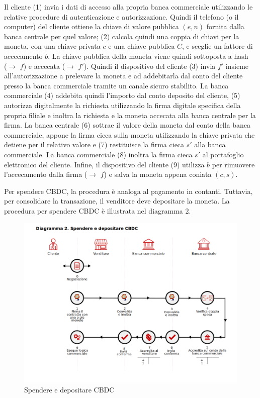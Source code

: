\documentclass[a4paper]{article}
\begin{document}
Il cliente (1) invia i dati di accesso alla propria banca commerciale
utilizzando le relative procedure di autenticazione e autorizzazione.
Quindi il telefono (o il computer) del cliente ottiene la chiave di
valore pubblica $(e, n)$ fornita dalla banca centrale per quel valore; (2)
calcola quindi una coppia di chiavi per la moneta, con una chiave
privata $c$ e una chiave pubblica $C$, e sceglie un fattore di accecamento
$b$. La chiave pubblica della moneta viene quindi sottoposta a hash \\
($\to$ $f$) e accecata ($\to$ $f'$). Quindi il dispositivo del cliente (3)
invia $f'$ insieme all'autorizzazione a prelevare la moneta e ad
addebitarla dal conto del cliente presso la banca commerciale tramite un
canale sicuro stabilito. La banca commerciale (4) addebita quindi
l'importo dal conto deposito del cliente, (5) autorizza digitalmente la
richiesta utilizzando la firma digitale specifica della propria filiale
e inoltra la richiesta e la moneta accecata alla banca centrale per la
firma. La banca centrale (6) sottrae il valore della moneta dal conto
della banca commerciale, appone la firma cieca sulla moneta
utilizzando la chiave privata che detiene per il relativo valore e (7)
restituisce la firma cieca $s'$ alla banca commerciale. La banca
commerciale (8) inoltra la firma cieca $s'$ al portafoglio elettronico
del cliente. Infine, il dispositivo del cliente (9) utilizza $b$ per
rimuovere l'accecamento dalla firma ($\to$ $f$) e salva la moneta appena
coniata $(c, s)$.

Per spendere CBDC, la procedura è analoga al pagamento in contanti.
Tuttavia, per consolidare la transazione, il venditore deve depositare
la moneta. La procedura per spendere CBDC è illustrata nel diagramma 2.

\begin{figure}[h!]
  \includegraphics[width=\textwidth]{diagramma2-it.png}
  \caption{Spendere e depositare CBDC}
  \label{fig:fig2}
\end{figure}
\end{document}
